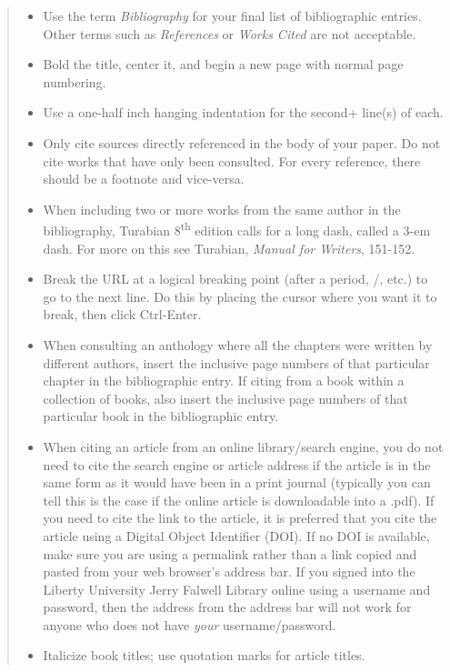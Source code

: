 \documentclass[raggedright]{turabian-researchpaper}
\begin{document}
\begin{quotation}
\begin{itemize}
\item Use the term \textit{Bibliography} for your final list of bibliographic
  entries. Other terms such as \textit{References} or \textit{Works Cited} are
  not acceptable.
\item Bold the title, center it, and begin a new page with normal page
  numbering.
\item Use a one-half inch hanging indentation for the second+ line(s) of each.
\item Only cite sources directly referenced in the body of your paper. Do not
  cite works that have only been consulted. For every reference, there should be
  a footnote and vice-versa.
\item When including two or more works from the same author in the bibliography,
  Turabian 8\textsuperscript{th} edition calls for a long dash, called a 3-em
  dash. For more on this see Turabian, \textit{Manual for Writers}, 151-152.
\item Break the URL at a logical breaking point (after a period, /, etc.) to go
  to the next line. Do this by placing the cursor where you want it to break,
  then click Ctrl-Enter.
\item When consulting an anthology where all the chapters were written by
  different authors, insert the inclusive page numbers of that particular
  chapter in the bibliographic entry. If citing from a book within a collection
  of books, also insert the inclusive page numbers of that particular book in
  the bibliographic entry.
\item When citing an article from an online library/search engine, you do not
  need to cite the search engine or article address if the article is in the
  same form as it would have been in a print journal (typically you can tell
  this is the case if the online article is downloadable into a .pdf). If you
  need to cite the link to the article, it is preferred that you cite the
  article using a Digital Object Identifier (DOI). If no DOI is available, make
  sure you are using a permalink rather than a link copied and pasted from your
  web browser's address bar. If you signed into the Liberty University Jerry
  Falwell Library online using a username and password, then the address from
  the address bar will not work for anyone who does not have \emph{your}
  username/password.
\item Italicize book titles; use quotation marks for article titles.

\end{itemize}
\end{quotation}
\end{document}
